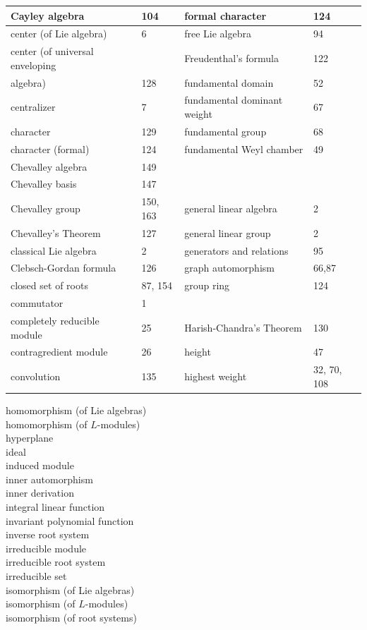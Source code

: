 \documentclass[10pt]{article}
\begin{document}
\begin{center}
\begin{tabular}{|l|l|l|l|}
\hline
Cayley algebra & 104 & formal character & 124 \\
\hline
center (of Lie algebra) & 6 & free Lie algebra & 94 \\
\hline
center (of universal enveloping &  & Freudenthal's formula & 122 \\
\hline
algebra) & 128 & fundamental domain & 52 \\
\hline
centralizer & 7 & fundamental dominant weight & 67 \\
\hline
character & 129 & fundamental group & 68 \\
\hline
character (formal) & 124 & fundamental Weyl chamber & 49 \\
\hline
Chevalley algebra & 149 &  &  \\
\hline
Chevalley basis & 147 &  &  \\
\hline
Chevalley group & 150, 163 & general linear algebra & 2 \\
\hline
Chevalley's Theorem & 127 & general linear group & 2 \\
\hline
classical Lie algebra & 2 & generators and relations & 95 \\
\hline
Clebsch-Gordan formula & 126 & graph automorphism & 66,87 \\
\hline
closed set of roots & 87, 154 & group ring & 124 \\
\hline
commutator & 1 &  &  \\
\hline
completely reducible module & 25 & Harish-Chandra's Theorem & 130 \\
\hline
contragredient module & 26 & height & 47 \\
\hline
convolution & 135 & highest weight & 32, 70, 108 \\
\hline
\end{tabular}
\end{center}

homomorphism (of Lie algebras)\\
homomorphism (of $L$-modules)\\
hyperplane\\
ideal\\
induced module\\
inner automorphism\\
inner derivation\\
integral linear function\\
invariant polynomial function\\
inverse root system\\
irreducible module\\
irreducible root system\\
irreducible set\\
isomorphism (of Lie algebras)\\
isomorphism (of $L$-modules)\\
isomorphism (of root systems)
\end{document}
